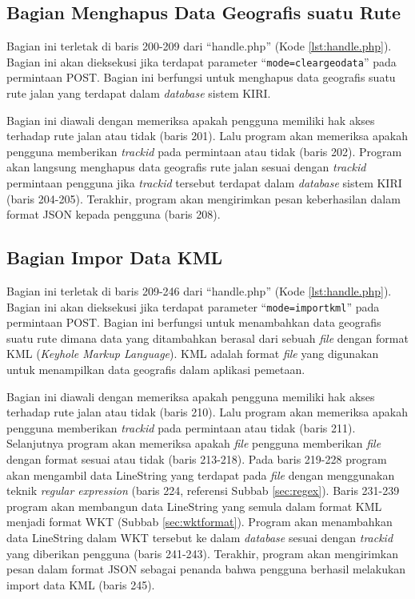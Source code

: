 \subsection{Bagian Menghapus Data Geografis suatu Rute}
\label{sec:hapusdatageografis}
Bagian ini terletak di baris 200-209 dari ``handle.php'' (Kode \ref{lst:handle.php}). Bagian ini akan dieksekusi jika terdapat parameter ``\texttt{mode=cleargeodata}'' pada permintaan POST. Bagian ini berfungsi untuk menghapus data geografis suatu rute jalan yang terdapat dalam \textit{database} sistem KIRI.

Bagian ini diawali dengan memeriksa apakah pengguna memiliki hak akses terhadap rute jalan atau tidak (baris 201). Lalu program akan memeriksa apakah pengguna memberikan \textit{trackid} pada permintaan atau tidak (baris 202). Program akan langsung menghapus data geografis rute jalan sesuai dengan \textit{trackid} permintaan pengguna jika \textit{trackid} tersebut terdapat dalam \textit{database} sistem KIRI (baris 204-205). Terakhir, program akan mengirimkan pesan keberhasilan dalam format JSON kepada pengguna (baris 208).

\subsection{Bagian Impor Data KML}
\label{sec:imporkml}
Bagian ini terletak di baris 209-246 dari ``handle.php'' (Kode \ref{lst:handle.php}). Bagian ini akan dieksekusi jika terdapat parameter ``\texttt{mode=importkml}'' pada permintaan POST. Bagian ini berfungsi untuk menambahkan data geografis suatu rute dimana data yang ditambahkan berasal dari sebuah \textit{file} dengan format KML (\textit{Keyhole Markup Language}). KML adalah format \textit{file} yang digunakan untuk menampilkan data geografis dalam aplikasi pemetaan\cite{kml}. 

Bagian ini diawali dengan memeriksa apakah pengguna memiliki hak akses terhadap rute jalan atau tidak (baris 210). Lalu program akan memeriksa apakah pengguna memberikan \textit{trackid} pada permintaan atau tidak (baris 211). Selanjutnya program akan memeriksa apakah \textit{file} pengguna memberikan \textit{file} dengan format sesuai atau tidak (baris 213-218). Pada baris 219-228 program akan mengambil data LineString yang terdapat pada \textit{file} dengan menggunakan teknik \textit{regular expression} (baris 224, referensi Subbab \ref{sec:regex}). Baris 231-239 program akan membangun data LineString yang semula dalam format KML menjadi format WKT (Subbab \ref{sec:wktformat}). Program akan menambahkan data LineString dalam WKT tersebut ke dalam \textit{database} sesuai dengan \textit{trackid} yang diberikan pengguna (baris 241-243). Terakhir, program akan mengirimkan pesan dalam format JSON sebagai penanda bahwa pengguna berhasil melakukan import data KML (baris 245).

